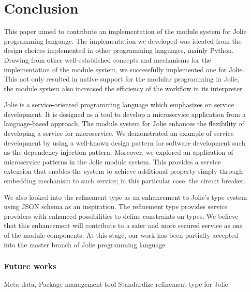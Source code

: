 \chapter{Conclusion}
This paper aimed to contribute an implementation of the module system for Jolie programming language.
The implementation we developed was ideated from the design choices implemented in other programming languages, mainly Python.
Drawing from other well-established concepts and mechanisms for the implementation of the module system, we successfully implemented one for Jolie.
This not only resulted in native support for the modular programming in Jolie, the module system also increased the efficiency of the workflow in its interpreter.

Jolie is a service-oriented programming language which emphasizes on service development. It is designed as a tool to develop a microservice application from a language-based approach. The module system for Jolie enhances the flexibility of developing a service for microservice. We demonstrated an example of service development by using a well-known design pattern for software development such as the dependency injection pattern. Moreover, we explored an application of microservice patterns in the Jolie module system. This provides a service extension that enables the system to achieve additional property simply through embedding mechanism to such service; in this particular case, the circuit breaker.

We also looked into the refinement type as an enhancement to Jolie’s type system using JSON schema as an inspiration. The refinement type provides service providers with enhanced possibilities to define constraints on types. We believe that this enhancement will contribute to a safer and more secured service as one of the module components.
At this stage, our work has been partially accepted into the master branch of Jolie programming language

\subsection{Future works}
Meta-data, Package management tool
Standardize refinement type for Jolie
